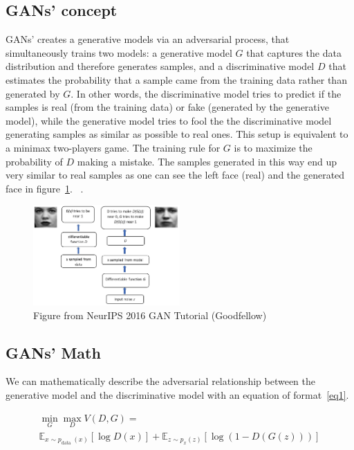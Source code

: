 \documentclass[]{IEEEtran}
\begin{document}
\subsection{GANs' concept  }
GANs' creates a generative models via an adversarial process, that simultaneously trains two models: a generative model $G$ that captures the data distribution and therefore generates samples, and a discriminative model $D$ that estimates the probability that a sample came from the training data rather than generated by $G$. In other words, the discriminative model tries to predict if the samples is real (from the training data) or fake (generated by the generative model), while the generative model tries to fool the the discriminative model generating samples as similar as possible to real ones. This setup is equivalent to a minimax two-players game. The training rule for $G$ is to maximize the probability of $D$ making a mistake. The samples generated in this way end up very similar to real samples as one can see the left face (real) and the generated face in figure~\ref{fig02}. ~\cite{Goodfellow2014GenerativeAN}.\par

\begin{figure}[ht]
  \centering
\includegraphics[width=0.5\textwidth]{./images/fig02_flux.png}
  \hspace{1mm}
  \caption{Figure from NeurIPS 2016 GAN Tutorial (Goodfellow)}
  \label{fig02}
\end{figure}

\subsection{GANs' Math}
We can mathematically describe the adversarial relationship between the generative model and the discriminative model with an equation of format~\ref{eq1}.

\begin{equation}
\begin{split}
\min _{G} \max _{D} V(D, G)=\\
\mathbb{E}_{x \sim p_{\text {data }}(x)}[\log D(x)]+\mathbb{E}_{z \sim p_{x}(z)}[\log (1-D(G(z)))]
\label{eq1}
\end{split}
\end{equation}
\end{document}
